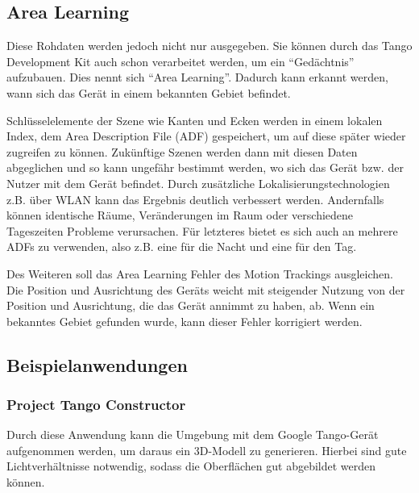 \subsection{Area Learning \cite{tango_area_learning}}
Diese Rohdaten werden jedoch nicht nur ausgegeben. Sie können durch das Tango Development Kit auch schon verarbeitet werden, um ein "`Gedächtnis"' aufzubauen. Dies nennt sich "`Area Learning"'. Dadurch kann erkannt werden, wann sich das Gerät in einem bekannten Gebiet befindet.\par
Schlüsselelemente der Szene wie Kanten und Ecken werden in einem lokalen Index, dem Area Description File (ADF) gespeichert, um auf diese später wieder zugreifen zu können. Zukünftige Szenen werden dann mit diesen Daten abgeglichen und so kann ungefähr bestimmt werden, wo sich das Gerät bzw. der Nutzer mit dem Gerät befindet. Durch zusätzliche Lokalisierungstechnologien z.B. über WLAN kann das Ergebnis deutlich verbessert werden. Andernfalls können identische Räume, Veränderungen im Raum oder verschiedene Tageszeiten Probleme verursachen. Für letzteres bietet es sich auch an mehrere ADFs zu verwenden, also z.B. eine für die Nacht und eine für den Tag.\par
Des Weiteren soll das Area Learning Fehler des Motion Trackings ausgleichen. Die Position und Ausrichtung des Geräts weicht mit steigender Nutzung von der Position und Ausrichtung, die das Gerät annimmt zu haben, ab. Wenn ein bekanntes Gebiet gefunden wurde, kann dieser Fehler korrigiert werden.

\subsection{Beispielanwendungen \cite{tango_apps}}

\subsubsection{Project Tango Constructor}
Durch diese Anwendung kann die Umgebung mit dem Google Tango-Gerät aufgenommen werden, um daraus ein 3D-Modell zu generieren. Hierbei sind gute Lichtverhältnisse notwendig, sodass die Oberflächen gut abgebildet werden können.

